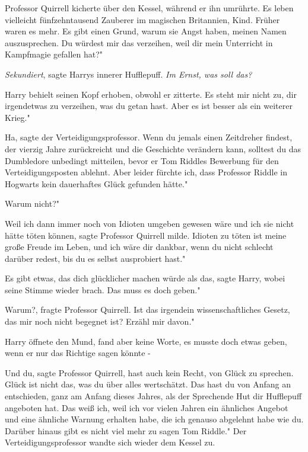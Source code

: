 Professor Quirrell kicherte über den Kessel, während er ihn umrührte. \glqq Es
leben vielleicht fünfzehntausend Zauberer im magischen Britannien, Kind. Früher
waren es mehr. Es gibt einen Grund, warum sie Angst haben, meinen Namen
auszusprechen. Du würdest mir das verzeihen, weil dir mein Unterricht in
Kampfmagie gefallen hat?"

\emph{Sekundiert}, sagte Harrys innerer Hufflepuff. \emph{Im Ernst, was soll
das?}

Harry behielt seinen Kopf erhoben, obwohl er zitterte. \glqq Es steht mir nicht
zu, dir irgendetwas zu verzeihen, was du getan hast. Aber es ist besser als ein
weiterer Krieg."

\glqq Ha\grqq{}, sagte der Verteidigungsprofessor. \glqq Wenn du jemals einen
Zeitdreher findest, der vierzig Jahre zurückreicht und die Geschichte verändern
kann, solltest du das Dumbledore unbedingt mitteilen, bevor er Tom Riddles
Bewerbung für den Verteidigungsposten ablehnt. Aber leider fürchte ich, dass
Professor Riddle in Hogwarts kein dauerhaftes Glück gefunden hätte."

\glqq Warum nicht?"

\glqq Weil ich dann immer noch von Idioten umgeben gewesen wäre und ich sie
nicht hätte töten können\grqq{}, sagte Professor Quirrell milde. \glqq Idioten
zu töten ist meine große Freude im Leben, und ich wäre dir dankbar, wenn du
nicht schlecht darüber redest, bis du es selbst ausprobiert hast."

\glqq Es gibt etwas, das dich glücklicher machen würde als das\grqq{}, sagte
Harry, wobei seine Stimme wieder brach. \glqq Das muss es doch geben."

\glqq Warum?\grqq{}, fragte Professor Quirrell. \glqq Ist das irgendein
wissenschaftliches Gesetz, das mir noch nicht begegnet ist? Erzähl mir davon."

Harry öffnete den Mund, fand aber keine Worte, es musste doch etwas geben, wenn
er nur das Richtige sagen könnte -

\glqq Und du\grqq{}, sagte Professor Quirrell, \glqq hast auch kein Recht, von
Glück zu sprechen. Glück ist nicht das, was du über alles wertschätzt. Das hast
du von Anfang an entschieden, ganz am Anfang dieses Jahres, als der Sprechende
Hut dir Hufflepuff angeboten hat. Das weiß ich, weil ich vor vielen Jahren ein
ähnliches Angebot und eine ähnliche Warnung erhalten habe, die ich genauso
abgelehnt habe wie du. Darüber hinaus gibt es nicht viel mehr zu sagen Tom
Riddle." Der Verteidigungsprofessor wandte sich wieder dem Kessel zu.

